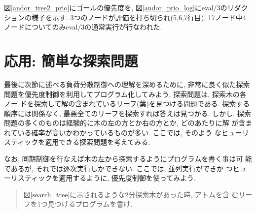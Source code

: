 \documentclass[a4,titlepage]{jsreport}
\begin{document}
図\ref{andor_tree2_prio}にゴールの優先度を, 
図\ref{andor_prio_log}にeval/3のリダクションの様子を示す.  
3つのノードが評価を打ち切られ(5,6,7行目), 
17ノード中4ノードについてのみeval/3の通常実行が行なわれた.  

\section{応用: 簡単な探索問題}

最後に次節に述べる負荷分散制御への理解を深めるために,
非常に良く似た探索問題を優先度制御を利用してプログラム化してみよう.  
探索問題は, 探索木の各ノー
ドを探索して解の含まれているリーフ(葉)を見つける問題である.  探索する
順序には関係なく, 最悪全てのリーフを探索すれば答えは見つかる.  しかし, 
探索問題の多くのものは経験的に木の左の方とか右の方とか, どのあたりに解
が含まれている確率が高いかわかっているものが多い.  ここでは, そのよう
なヒューリスティックを適用できる探索問題を考えてみる.

なお, 同期制御を行なえば木の左から探索するようにプログラムを書く事は可
能であるが, それでは逐次実行しかできない.  ここでは, 並列実行ができか
つヒューリスティックを適用するように, 優先度制御を使ってみよう.


\begin{quote}\begin{dg}\begin{bf}
図\ref{search_tree}に示されるような2分探索木があった時, アトムを含
むリーフを1つ見つけるプログラムを書け.
\end{bf}\end{dg}\end{quote}
\end{document}
